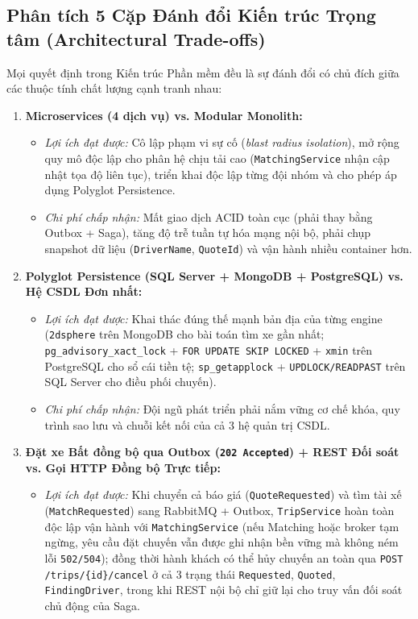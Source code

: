 \documentclass[12pt,a4paper]{article}
\begin{document}
\subsection{Phân tích 5 Cặp Đánh đổi Kiến trúc Trọng tâm (Architectural Trade-offs)}
Mọi quyết định trong Kiến trúc Phần mềm đều là sự đánh đổi có chủ đích giữa các thuộc tính chất lượng cạnh tranh nhau:
\begin{enumerate}[leftmargin=1.5em]
    \item \textbf{Microservices (4 dịch vụ) vs. Modular Monolith:}
    \begin{itemize}[nosep]
        \item \textit{Lợi ích đạt được:} Cô lập phạm vi sự cố (\textit{blast radius isolation}), mở rộng quy mô độc lập cho phân hệ chịu tải cao (\texttt{MatchingService} nhận cập nhật tọa độ liên tục), triển khai độc lập từng đội nhóm và cho phép áp dụng Polyglot Persistence.
        \item \textit{Chi phí chấp nhận:} Mất giao dịch ACID toàn cục (phải thay bằng Outbox + Saga), tăng độ trễ tuần tự hóa mạng nội bộ, phải chụp snapshot dữ liệu (\texttt{DriverName}, \texttt{QuoteId}) và vận hành nhiều container hơn.
    \end{itemize}
    \item \textbf{Polyglot Persistence (SQL Server + MongoDB + PostgreSQL) vs. Hệ CSDL Đơn nhất:}
    \begin{itemize}[nosep]
        \item \textit{Lợi ích đạt được:} Khai thác đúng thế mạnh bản địa của từng engine (\texttt{2dsphere} trên MongoDB cho bài toán tìm xe gần nhất; \texttt{pg\_advisory\_xact\_lock} + \texttt{FOR UPDATE SKIP LOCKED} + \texttt{xmin} trên PostgreSQL cho sổ cái tiền tệ; \texttt{sp\_getapplock} + \texttt{UPDLOCK/READPAST} trên SQL Server cho điều phối chuyến).
        \item \textit{Chi phí chấp nhận:} Đội ngũ phát triển phải nắm vững cơ chế khóa, quy trình sao lưu và chuỗi kết nối của cả 3 hệ quản trị CSDL.
    \end{itemize}
    \item \textbf{Đặt xe Bất đồng bộ qua Outbox (\texttt{202 Accepted}) + REST Đối soát vs. Gọi HTTP Đồng bộ Trực tiếp:}
    \begin{itemize}[nosep]
        \item \textit{Lợi ích đạt được:} Khi chuyển cả báo giá (\texttt{QuoteRequested}) và tìm tài xế (\texttt{MatchRequested}) sang RabbitMQ + Outbox, \texttt{TripService} hoàn toàn độc lập vận hành với \texttt{MatchingService} (nếu Matching hoặc broker tạm ngừng, yêu cầu đặt chuyến vẫn được ghi nhận bền vững mà không ném lỗi \texttt{502/504}); đồng thời hành khách có thể hủy chuyến an toàn qua \texttt{POST /trips/\{id\}/cancel} ở cả 3 trạng thái \texttt{Requested}, \texttt{Quoted}, \texttt{FindingDriver}, trong khi REST nội bộ chỉ giữ lại cho truy vấn đối soát chủ động của Saga.

\end{itemize}
\end{enumerate}
\end{document}
